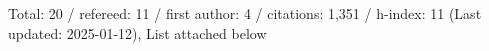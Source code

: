 Total: 20 / refereed: 11 / first author: 4 / citations: 1,351 / h-index: 11 (Last updated: 2025-01-12), List attached below
